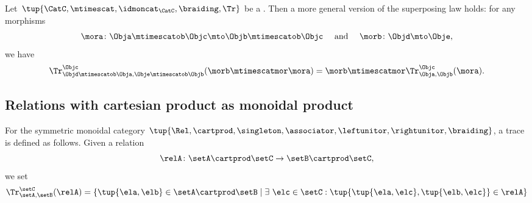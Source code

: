 \begin{lemma}
    \label{lem:general-superposing-law}
    Let~$\tup{\CatC, \mtimescat,\idmoncat_{\CatC}, \braiding, \Tr}$ be a .
    Then a more general version of the superposing law holds: for any morphisms~
    $$\mora\colon \Obja\mtimescatob \Objc \mto \Objb \mtimescatob \Objc \quad \text{ and } \quad \morb \colon \Objd \mto \Obje,$$
    we have 
    \begin{equation}
        \label{eq:superposing_2}
        \Tr_{\Objd\mtimescatob \Obja,\Obje\mtimescatob \Objb}^{\Objc}(\morb \mtimescatmor \mora)=\morb \mtimescatmor \Tr_{\Obja,\Objb}^\Objc(\mora).
    \end{equation}
\end{lemma}


\subsection{Relations with cartesian product as monoidal product}

\begin{ctdefinition}
    For the symmetric monoidal category $\tup{\Rel, \cartprod, \singleton, \associator, \leftunitor, \rightunitor, \braiding}$, a trace is defined as follows.
    Given a relation
    \begin{equation}
        \relA \colon \setA \cartprod \setC \to \setB \cartprod \setC,
    \end{equation}
    we set
    \begin{equation}
        \Tr_{\setA,\setB}^\setC (\relA) = \{ \tup{\ela, \elb} \in \setA \cartprod \setB \mid \exists \ \elc \in \setC : \tup{\tup{\ela, \elc}, \tup{\elb, \elc}} \in \relA \}
    \end{equation}
\end{ctdefinition}



